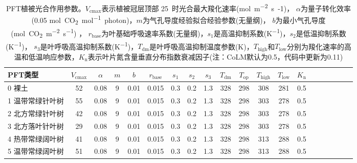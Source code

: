 \begin{landscape}
  \begin{table}[htbp]
    \centering
    \caption[PFT植被光合作用参数]{PFT植被光合作用参数。$V_{\mathrm{cmax}}$表示植被冠层顶部 25~\textcelsius 时光合最大羧化速率(\unit{mol.m^{-2}.s{-1}})，
      $\alpha$为量子转化效率(0.05 \unit{mol.CO_2.mol^{-1}.photon})，$m$为气孔导度经验拟合经验参数(无量纲)，
      $b$为最小气孔导度(\unit{mol.CO_2.m^{-2}.s^{-1}}) ，
      $r_{\mathrm{base}}$为叶基础呼吸速率系数(无量纲)，$s_1$是高温抑制系数(\unit{K^{-1}})，$s_2$是低温抑制系数(\unit{K^{-1}})，
    $s_3$是叶呼吸高温抑制系数(\unit{K^{-1}})，$T_{\mathrm{dm}}$是叶呼吸高温抑制温度参数(K)，$T_{\mathrm{high}}$和$T_{\mathrm{low}}$分别为羧化速率的高温和低温响应参数，$K_{\mathrm {n}} $表示叶片氮含量垂直分布指数衰减因子(注：CoLM默认为0.5，代码中更新为0.11)}
    \label{tab:PFT植被光合作用参数1}
    \begin{tabular}{@{}lccccccccccccccccccc@{}}
      \toprule
      PFT类型             & $ V_{\mathrm{cmax}}$ & $\alpha$ & $m$ & $b$  & $r_{\mathrm{base}}$ & $s_1$ & $s_2$ & $s_3$ & $T_{\mathrm{dm}}$ & $T_{\mathrm{op}}$ & $T_{\mathrm{high}}$ & $T_{\mathrm{low}}$ & $K_{\mathrm {n}} $ \\ \midrule
      0 裸土              & 52                   & 0.08     & 9   & 0.01 & 0.015               & 0.3   & 0.2   & 1.3   & 328               & 298               & 308                 & 281                & 0.5                \\
      1 温带常绿针叶树    & 55                   & 0.08     & 9   & 0.01 & 0.015               & 0.3   & 0.2   & 1.3   & 328               & 298               & 303                 & 278                & 0.5                \\
      2 北方常绿针叶树    & 42                   & 0.08     & 9   & 0.01 & 0.015               & 0.3   & 0.2   & 1.3   & 328               & 298               & 303                 & 278                & 0.5                \\
      3 北方落叶针叶树    & 29                   & 0.08     & 9   & 0.01 & 0.015               & 0.3   & 0.2   & 1.3   & 328               & 298               & 303                 & 278                & 0.5                \\
      4 热带常绿阔叶树    & 41                   & 0.08     & 9   & 0.01 & 0.015               & 0.3   & 0.2   & 1.3   & 328               & 298               & 313                 & 288                & 0.5                \\
      5 温带常绿阔叶树    & 51                   & 0.08     & 9   & 0.01 & 0.015               & 0.3   & 0.2   & 1.3   & 328               & 298               & 313                 & 288                & 0.5                \\

\end{tabular}
\end{table}
\end{landscape}
